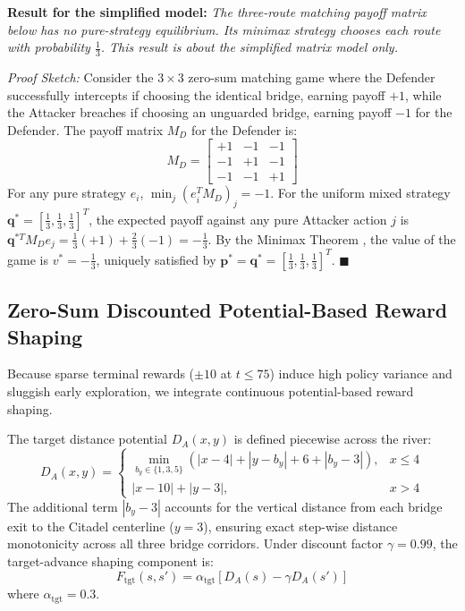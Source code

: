 \documentclass[conference]{IEEEtran}
\begin{document}
\textbf{Result for the simplified model:} \textit{The three-route matching payoff matrix below has no pure-strategy equilibrium. Its minimax strategy chooses each route with probability $\frac{1}{3}$. This result is about the simplified matrix model only.}

\textit{Proof Sketch:} Consider the $3 \times 3$ zero-sum matching game where the Defender successfully intercepts if choosing the identical bridge, earning payoff $+1$, while the Attacker breaches if choosing an unguarded bridge, earning payoff $-1$ for the Defender. The payoff matrix $M_D$ for the Defender is:
\begin{equation}
M_D = \begin{bmatrix} +1 & -1 & -1 \\ -1 & +1 & -1 \\ -1 & -1 & +1 \end{bmatrix}
\end{equation}
For any pure strategy $e_i$, $\min_j (e_i^T M_D)_j = -1$. For the uniform mixed strategy $\bm{q}^* = [\frac{1}{3}, \frac{1}{3}, \frac{1}{3}]^T$, the expected payoff against any pure Attacker action $j$ is $\bm{q}^{*T} M_D e_j = \frac{1}{3}(+1) + \frac{2}{3}(-1) = -\frac{1}{3}$. By the Minimax Theorem \cite{von1944theory}, the value of the game is $v^* = -\frac{1}{3}$, uniquely satisfied by $\bm{p}^* = \bm{q}^* = [\frac{1}{3}, \frac{1}{3}, \frac{1}{3}]^T$. \hfill $\blacksquare$

\subsection{Zero-Sum Discounted Potential-Based Reward Shaping}
Because sparse terminal rewards ($\pm 10$ at $t \le 75$) induce high policy variance and sluggish early exploration, we integrate continuous potential-based reward shaping.

The target distance potential $D_A(x, y)$ is defined piecewise across the river:
\begin{equation}
D_A(x, y) = \begin{cases} 
\min_{b_y \in \{1, 3, 5\}} \left( |x - 4| + |y - b_y| + 6 + |b_y - 3| \right), & x \le 4 \\
|x - 10| + |y - 3|, & x > 4
\end{cases}
\end{equation}
The additional term $|b_y - 3|$ accounts for the vertical distance from each bridge exit to the Citadel centerline ($y=3$), ensuring exact step-wise distance monotonicity across all three bridge corridors. Under discount factor $\gamma = 0.99$, the target-advance shaping component is:
\begin{equation}
F_{\text{tgt}}(s, s') = \alpha_{\text{tgt}} \left[ D_A(s) - \gamma D_A(s') \right]
\label{eq:shaping_tgt}
\end{equation}
where $\alpha_{\text{tgt}} = 0.3$.
\end{document}

